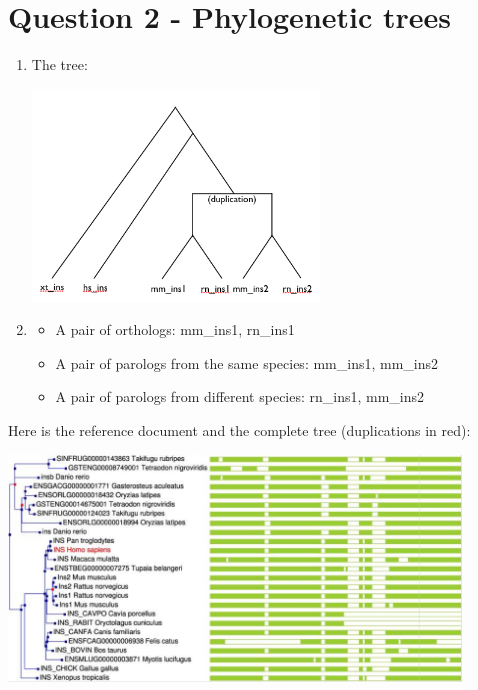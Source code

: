 \documentclass[a4paper,11pt]{article}
\begin{document}
\section*{Question 2 - Phylogenetic trees}

\begin{enumerate}

\item The tree:

\centering
\includegraphics[width=0.6\textwidth]{phylo.png}\\

\item 
\begin{itemize}
	\item A pair of orthologs: mm\_ins1, rn\_ins1
	\item A pair of parologs from the same species: mm\_ins1, mm\_ins2
	\item A pair of parologs from different species: rn\_ins1, mm\_ins2
\end{itemize}

\end{enumerate}

Here is the reference document and the complete tree (duplications in red):

\vspace{0.5cm}
\centering
\includegraphics[width=0.9\textwidth]{phylo2.png}
\vspace{0.3cm}
\end{document}
